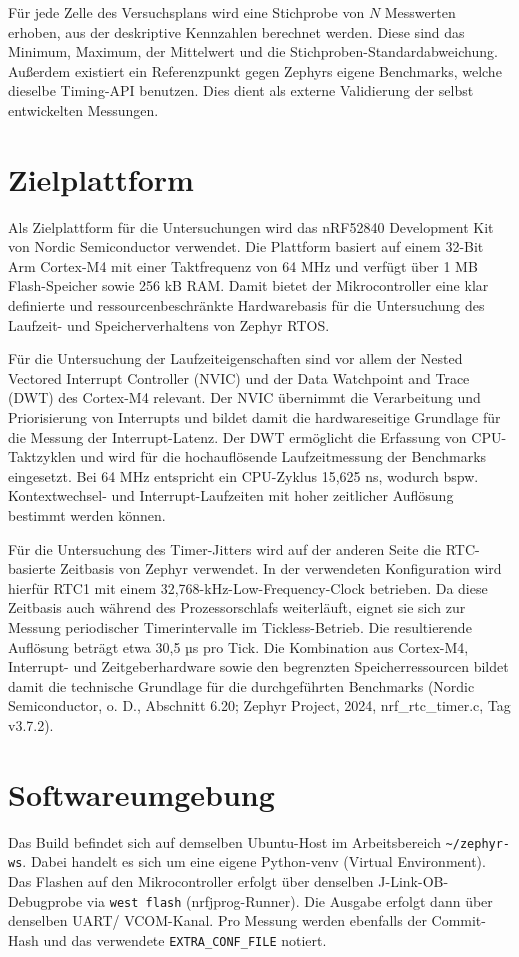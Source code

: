 Für jede Zelle des Versuchsplans wird eine Stichprobe von \(N\) Messwerten erhoben, aus der deskriptive Kennzahlen berechnet werden. Diese sind das Minimum, Maximum, der Mittelwert und die Stichproben-Standardabweichung. Außerdem existiert ein Referenzpunkt gegen Zephyrs eigene Benchmarks, welche dieselbe Timing-API benutzen. Dies dient als externe Validierung der selbst entwickelten Messungen.

\section{Zielplattform}
Als Zielplattform für die Untersuchungen wird das nRF52840 Development Kit von Nordic Semiconductor verwendet. Die Plattform basiert auf einem 32-Bit Arm Cortex-M4 mit einer Taktfrequenz von 64 MHz und verfügt über 1 MB Flash-Speicher sowie 256 kB RAM. Damit bietet der Mikrocontroller eine klar definierte und ressourcenbeschränkte Hardwarebasis für die Untersuchung des Laufzeit- und Speicherverhaltens von Zephyr RTOS.

Für die Untersuchung der Laufzeiteigenschaften sind vor allem der Nested Vectored Interrupt Controller (NVIC) und der Data Watchpoint and Trace (DWT) des Cortex-M4 relevant. Der NVIC übernimmt die Verarbeitung und Priorisierung von Interrupts und bildet damit die hardwareseitige Grundlage für die Messung der Interrupt-Latenz. Der DWT ermöglicht die Erfassung von CPU-Taktzyklen und wird für die hochauflösende Laufzeitmessung der Benchmarks eingesetzt. Bei 64 MHz entspricht ein CPU-Zyklus 15,625 ns, wodurch bspw. Kontextwechsel- und Interrupt-Laufzeiten mit hoher zeitlicher Auflösung bestimmt werden können.

Für die Untersuchung des Timer-Jitters wird auf der anderen Seite die RTC-basierte Zeitbasis von Zephyr verwendet. In der verwendeten Konfiguration wird hierfür RTC1 mit einem 32,768-kHz-Low-Frequency-Clock betrieben. Da diese Zeitbasis auch während des Prozessorschlafs weiterläuft, eignet sie sich zur Messung periodischer Timerintervalle im Tickless-Betrieb. Die resultierende Auflösung beträgt etwa 30,5 µs pro Tick. Die Kombination aus Cortex-M4, Interrupt- und Zeitgeberhardware sowie den begrenzten Speicherressourcen bildet damit die technische Grundlage für die durchgeführten Benchmarks (Nordic Semiconductor, o. D., Abschnitt 6.20; Zephyr Project, 2024, nrf\_rtc\_timer.c, Tag v3.7.2).

\section{Softwareumgebung}
Das Build befindet sich auf demselben Ubuntu-Host im Arbeitsbereich \lstinline[style=fileinline]|~/zephyr-ws|. Dabei handelt es sich um eine eigene Python-venv (Virtual Environment). Das Flashen auf den Mikrocontroller erfolgt über denselben J-Link-OB-Debugprobe via \lstinline[style=fileinline]|west flash| (nrfjprog-Runner). Die Ausgabe erfolgt dann über denselben UART/ VCOM-Kanal. Pro Messung werden ebenfalls der Commit-Hash und das verwendete \lstinline[style=fileinline]|EXTRA_CONF_FILE| notiert.

